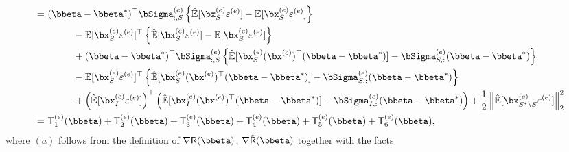 \documentclass[10pt]{article}
\numberwithin{equation}{section}
\begin{document}
\begin{align}
=&~  (\bbeta - \bbeta^*)^\top \bSigma^{(e)}_{:,S} \left\{\hat{\mathbb{E}}[\bx_S^{(e)} \varepsilon^{(e)}] - \mathbb{E}[\bx_S^{(e)} \varepsilon^{(e)}]\right\} \nonumber\\
&~~~~~~~~~ -\mathbb{E}[\bx^{(e)}_S \varepsilon^{(e)}]^\top \left\{\hat{\mathbb{E}}[\bx_S^{(e)} \varepsilon^{(e)}] - \mathbb{E}[\bx_S^{(e)} \varepsilon^{(e)}]\right\} \nonumber\\
&~~~~~~~~~ +(\bbeta - \bbeta^*)^\top \bSigma_{:,S}^{(e)} \left\{\hat{\mathbb{E}}[\bx_S^{(e)} (\bx^{(e)})^\top (\bbeta - \bbeta^*)] - \bSigma^{(e)}_{S,:} (\bbeta- \bbeta^*)\right\} \nonumber\\
&~~~~~~~~~ -\mathbb{E}[\bx_S^{(e)}\varepsilon^{(e)}]^\top \left\{\hat{\mathbb{E}}[\bx_S^{(e)} (\bx^{(e)})^\top (\bbeta - \bbeta^*)] - \bSigma^{(e)}_{S,:} (\bbeta- \bbeta^*)\right\} \nonumber\\
&~~~~~~~~~ +\left(\hat{\mathbb{E}}[\bx_{I}^{(e)} \varepsilon^{(e)}] \right)^\top \left(\hat{\mathbb{E}} [\bx_{I}^{(e)} (\bx^{(e)})^\top (\bbeta - \bbeta^*)] - \bSigma^{(e)}_{I,:} (\bbeta - \bbeta^*)\right) + \frac{1}{2} \left\|\hat{\mathbb{E}}[\bx_{S^*\setminus S}^{(e)} \varepsilon^{(e)}]\right\|_2^2\nonumber\\
=&~ \mathsf{T}^{(e)}_1(\bbeta) + \mathsf{T}^{(e)}_2(\bbeta) + \mathsf{T}^{(e)}_3(\bbeta) + \mathsf{T}^{(e)}_4(\bbeta) + \mathsf{T}^{(e)}_5(\bbeta) + \mathsf{T}_6^{(e)}(\bbeta), \label{eq:low-dim-id-decomposition}
\end{align}
where $(a)$ follows from the definition of $\nabla \mathsf{R}(\bbeta)$, $\nabla \hat{\mathsf{R}}(\bbeta)$ together with the facts
\end{document}
